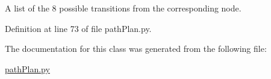 A list of the 8 possible transitions from the corresponding node. 



Definition at line 73 of file path\+Plan.\+py.



The documentation for this class was generated from the following file\+:\begin{DoxyCompactItemize}
\item 
\mbox{\hyperlink{path_plan_8py}{path\+Plan.\+py}}\end{DoxyCompactItemize}
